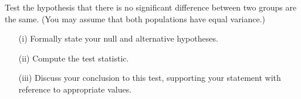 \documentclass[a4paper,12pt]{article}
\begin{document}
\begin{enumerate}
\noindent Test the hypothesis that there is no significant difference between two groups are the same. (You may assume that both populations have equal variance.)

\begin{itemize}
	\item[(i)] Formally state your null and alternative hypotheses.
	\item[(ii)] Compute the test statistic.
	\item[(iii)] Discuss your conclusion to this test, supporting your statement with reference to appropriate values.
\end{itemize}

\end{enumerate}
\end{document}
